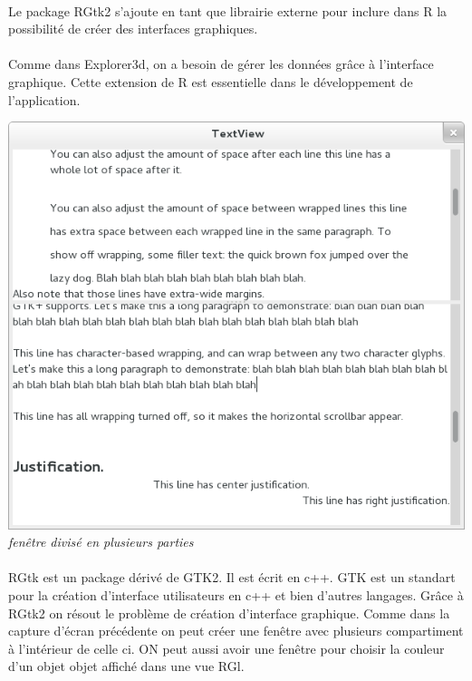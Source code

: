 \paragraph{}
Le package RGtk2 s'ajoute en tant que librairie externe pour inclure dans R la possibilité de créer des interfaces graphiques. 

\paragraph{}
Comme dans Explorer3d, on a besoin de gérer les données grâce à l'interface graphique. Cette extension de R est essentielle dans le développement de l'application. 

 \begin{center}
\includegraphics[scale=0.4]{multipleviews.png}\\
\textit{fenêtre divisé en plusieurs parties}
\end{center}

\paragraph{}
RGtk est un package dérivé de GTK2. Il est écrit en c++. GTK est un standart pour la création d'interface utilisateurs en c++ et bien d'autres langages. Grâce à RGtk2 on résout le problème de création d'interface graphique. Comme dans la capture d'écran précédente on peut créer une fenêtre avec plusieurs compartiment à l'intérieur de celle ci. ON peut aussi avoir une fenêtre pour choisir la couleur d'un objet objet affiché dans une vue RGl. 


